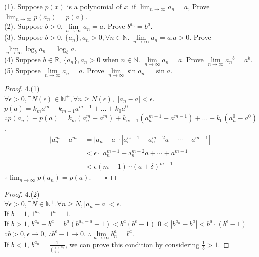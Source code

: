 \begin{qs}
(1). Suppose $ p(x) $ is a polynomial of $ x $, if $ \lim_{n\rightarrow\infty} a_n = a $, Prove $ \lim_{n\rightarrow\infty} p(a_n) = p(a) $.\\
(2). Suppose $ b > 0, \lim\limits_{n\rightarrow\infty} a_n = a $. Prove $ b^{a_n} = b^a $.\\
(3). Suppose $ b>0 $, $ \{a_n\}, a_n>0,\forall n\in\mathbb{N} $. $ \lim\limits_{n\rightarrow\infty} a_n = a $.$ a>0 $. Prove $ \lim\limits_{n\rightarrow\infty} \log_{b} a_n = \log_{b} a$.\\
(4) Suppose $ b\in\mathbb{R} $, $ \{a_n\}, a_n>0 $ when $ n\in\mathbb{N} $. $ \lim\limits_{n\rightarrow\infty}a_n=a $. Prove $ \lim\limits_{n\rightarrow\infty} {a_n}^b = a^b $.\\
(5) Suppose  $ \lim\limits_{n\rightarrow\infty}a_n=a $. Prove $ \lim\limits_{n\rightarrow\infty}\sin{a_n} = \sin a $.\\
\end{qs}
\begin{proof}4.(1)\\
	$ \forall \epsilon>0, \exists N(\epsilon) \in \mathbb{N}^+, \forall n \geqslant N(\epsilon), $
	$ |a_n-a| <\epsilon $.\\
	$ p(a) = k_{m}a^{m} + k_{m-1}a^{m-1} + \dots +  k_{0}a^{0} $.\\
	$ \therefore p(a_n) - p(a) =  k_{m}(a_n^{m}-a^{m}) + k_{m-1}(a_n^{m-1}-a^{m-1}) + \dots +  k_{0}(a_n^{0}-a^{0}) $.
	\begin{align*}
		|a_n^m - a^m| 
		&= |a_n-a|\cdot |a_n^{m-1} + a_n^{m-2}a + \cdots + a^{m-1}|\\
		&< \epsilon \cdot |a_n^{m-1} + a_n^{m-2}a + \cdots + a^{m-1}|\\
		&< \epsilon (m-1)\cdots(a+\delta)^{m-1}
	\end{align*}
	$ \therefore \lim_{n\rightarrow\infty} p(a_n) = p(a).\qquad\square  $  
\end{proof}


\begin{proof}4.(2)\\
	$\forall \epsilon >0, \exists N \in \mathbb{N}^+. \forall n \geqslant N, |a_n-a| < \epsilon$.\\
	If $ b=1 $, $ 1^{a_n} =1^a = 1 $.\\
	If $ b>1 $, $ b^{a_n}-b^a = b^a(b^{a_n-a}-1)<b^a(b^\epsilon-1) $
	$ 0<|b^{a_n}-b^a|<b^a\cdot(b^\epsilon-1) $
	$ \because b>0, \epsilon\rightarrow 0 $, $ \therefore b^\epsilon-1 \rightarrow 0 $.
	$ \therefore \lim\limits_{n\rightarrow\infty}b^a_n = b^a $.\\
	If $ b<1 $, $ b^{a_n} = \frac{1}{(\frac{1}{b})^{a_n}} $, we can prove this condition by considering $ \frac{1}{b} >1 $.
\end{proof}


